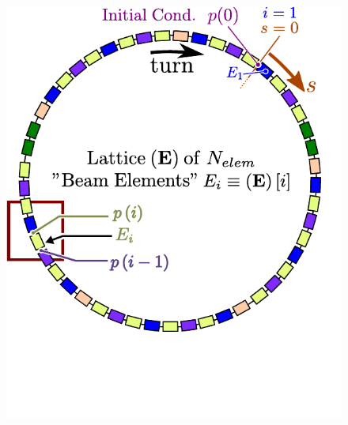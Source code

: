 \documentclass{beamer}
\begin{document}
\begin{frame}[t]
\begin{columns}
\begin{column}{0.35\textwidth}
{\begin{figure}[H]
        \includegraphics[width=\textwidth]{presentation_images/fig_tracking_algorithm_03}
    \end{figure}
}
{
    \begin{figure}[H]
        \centering

\end{figure}}
\end{column}
\end{columns}
\end{frame}
\end{document}
